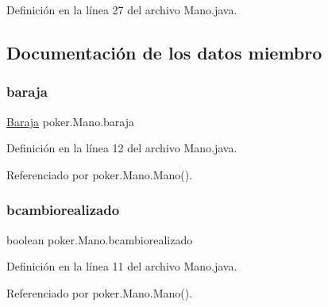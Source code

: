 Definición en la línea 27 del archivo Mano.\+java.


\begin{DoxyCode}{0}

\end{DoxyCode}


\subsection{Documentación de los datos miembro}
\mbox{\label{classpoker_1_1Mano_a9fd3c2334c2346b20e9e881b370fb564}} 
\subsubsection{\texorpdfstring{baraja}{baraja}}
{\footnotesize\ttfamily \mbox{\hyperlink{classpoker_1_1Baraja}{Baraja}} poker.\+Mano.\+baraja\hspace{0.3cm}{\ttfamily [private]}}



Definición en la línea 12 del archivo Mano.\+java.



Referenciado por poker.\+Mano.\+Mano().

\mbox{\label{classpoker_1_1Mano_a65e1d2bb8d29cf88b105c39f26f5aa38}} 
\subsubsection{\texorpdfstring{bcambiorealizado}{bcambiorealizado}}
{\footnotesize\ttfamily boolean poker.\+Mano.\+bcambiorealizado\hspace{0.3cm}{\ttfamily [private]}}



Definición en la línea 11 del archivo Mano.\+java.



Referenciado por poker.\+Mano.\+Mano().

\mbox{\label{classpoker_1_1Mano_ae6e107ad79d163a4c45afc6274d36d9e}} 
